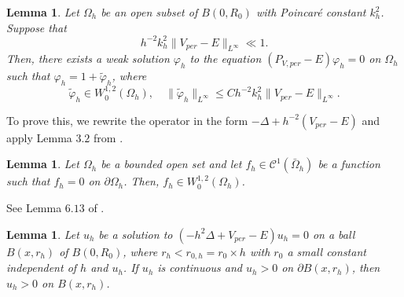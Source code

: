 \documentclass[leqno,11pt,letterpaper, english]{amsart}
\theoremstyle{plain}
\newtheorem{lem}[prop]{Lemma}
\theoremstyle{definition}
\numberwithin{equation}{section}
\begin{document}
\begin{lem}
\label{lem: small_laplacian_free_solution}
Let $\Omega_h$ be an open subset of $B(0, R_0)$ with Poincaré constant $k_h^2$. Suppose that
\[
h^{-2} k_h^2 \| V_{per} - E \|_{L^\infty} \ll 1.
\]
Then, there exists a weak solution $\varphi_h$ to the equation $(P_{V,per}-E) \varphi_h = 0$ on $\Omega_h$ such that $\varphi_h = 1 + \tilde{\varphi}_h$, where
\[
\tilde{\varphi}_h \in W_0^{1,2}(\Omega_h), \quad \|\tilde{\varphi}_h\|_{L^\infty} \leq C h^{-2} k_h^2 \| V_{per} - E \|_{L^\infty}.
\]
\end{lem}
To prove this, we rewrite the operator in the form $-\Delta + h^{-2}(V_{per} - E)$ and apply Lemma $3.2$ from \cite{logunov2020landisconjectureexponentialdecay}.

\begin{lem}
\label{lem: utility_1}
Let $\Omega_h$ be a bounded open set and let $f_h \in \mathcal{C}^1(\bar{\Omega}_h)$ be a function such that $f_h = 0$ on $\partial \Omega_h$. Then, $f_h \in W_0^{1,2}(\Omega_h)$.
\end{lem}
See Lemma $6.13$ of \cite{logunov2020landisconjectureexponentialdecay}.

\begin{lem}
\label{lem: positivity_radius}
Let $u_h$ be a solution to $(-h^2\Delta + V_{per} - E)u_h = 0$ on a ball $B(x, r_h)$ of $B(0, R_0)$, where $r_h < r_{0,h} = r_0\times h$ with $r_0$ a small constant independent of $h$ and $u_h$. If $u_h$ is continuous and $u_h > 0$ on $\partial B(x, r_h)$, then $u_h > 0$ on $B(x, r_h)$.
\end{lem}
\end{document}
